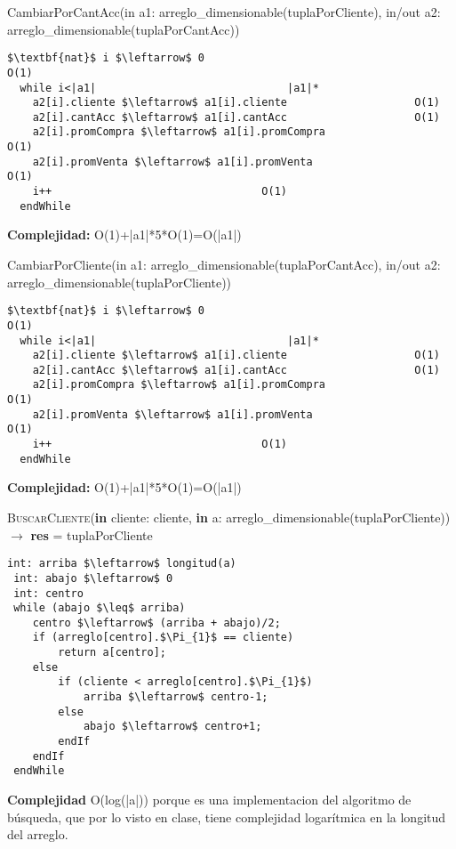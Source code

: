 CambiarPorCantAcc(in a1: arreglo\_dimensionable(tuplaPorCliente), in/out a2: arreglo\_dimensionable(tuplaPorCantAcc))
\begin{lstlisting}[mathescape]
  $\textbf{nat}$ i $\leftarrow$ 0										O(1)
  while i<|a1|								|a1|*
    a2[i].cliente $\leftarrow$ a1[i].cliente					O(1)
    a2[i].cantAcc $\leftarrow$ a1[i].cantAcc					O(1)
    a2[i].promCompra $\leftarrow$ a1[i].promCompra					O(1)
    a2[i].promVenta $\leftarrow$ a1[i].promVenta					O(1)
    i++									O(1)
  endWhile
\end{lstlisting}
\textbf{Complejidad:} O(1)+|a1|*5*O(1)=O(|a1|)

CambiarPorCliente(in a1: arreglo\_dimensionable(tuplaPorCantAcc), in/out a2: arreglo\_dimensionable(tuplaPorCliente))
\begin{lstlisting}[mathescape]
  $\textbf{nat}$ i $\leftarrow$ 0										O(1)
  while i<|a1|								|a1|*
    a2[i].cliente $\leftarrow$ a1[i].cliente					O(1)
    a2[i].cantAcc $\leftarrow$ a1[i].cantAcc					O(1)
    a2[i].promCompra $\leftarrow$ a1[i].promCompra					O(1)
    a2[i].promVenta $\leftarrow$ a1[i].promVenta					O(1)
    i++									O(1)
  endWhile
\end{lstlisting}
\textbf{Complejidad:} O(1)+|a1|*5*O(1)=O(|a1|)

\textsc{BuscarCliente}(\textbf{in} cliente: cliente, \textbf{in} a: arreglo\_dimensionable(tuplaPorCliente)) $\rightarrow$ \textbf{res} = tuplaPorCliente
\begin{lstlisting}[mathescape]
 int: arriba $\leftarrow$ longitud(a)
 int: abajo $\leftarrow$ 0
 int: centro
 while (abajo $\leq$ arriba)
 	centro $\leftarrow$ (arriba + abajo)/2;
    if (arreglo[centro].$\Pi_{1}$ == cliente)
 		return a[centro];
    else
 		if (cliente < arreglo[centro].$\Pi_{1}$)
   			arriba $\leftarrow$ centro-1;
 		else
   			abajo $\leftarrow$ centro+1;
   		endIf
   	endIf
 endWhile
\end{lstlisting}
\textbf{Complejidad} O(log(|a|)) porque es una implementacion del algoritmo de b\'usqueda, que por lo visto en clase, tiene complejidad logar\'itmica en la longitud del arreglo.\\

